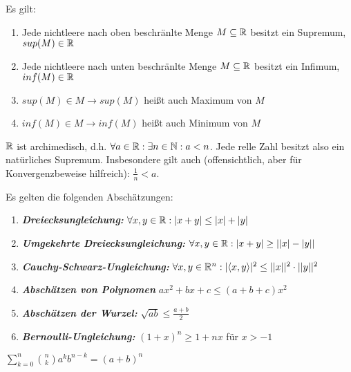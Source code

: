 \begin{satz}[Supremumsaxiom]
	Es gilt:
	\begin{enumerate}[noitemsep]
		\item Jede nichtleere nach oben beschränlte Menge $M \subseteq \mathbb{R}$ besitzt ein Supremum, $sup(M) \in \mathbb{R}$
		\item Jede nichtleere nach unten beschränlte Menge $M \subseteq \mathbb{R}$ besitzt ein Infimum, $inf(M) \in \mathbb{R}$
		\item $sup(M) \in M \rightarrow sup(M)$ heißt auch Maximum von $M$
		\item $inf(M) \in M \rightarrow inf(M)$ heißt auch Minimum von $M$
	\end{enumerate}
\end{satz}

\begin{satz}[Archimedizität]
	$\mathbb{R}$ ist archimedisch, d.h. $\forall a \in \mathbb{R} : \exists n \in \mathbb{N} : a < n $. Jede relle Zahl besitzt also ein natürliches Supremum. Insbesondere gilt auch (offensichtlich, aber für Konvergenzbeweise hilfreich): $\frac{1}{n} < a$.
\end{satz}

\begin{satz}[Abschätzungen]
	Es gelten die folgenden Abschätzungen:
	
	\begin{enumerate}[noitemsep]
		\item \textbf{\emph{Dreiecksungleichung:}} $\forall x,y \in \mathbb{R} : | x + y | \leq |x| + |y|$
		\item \textbf{\emph{Umgekehrte Dreiecksungleichung:}} 	$\forall x,y \in \mathbb{R} : | x + y | \geq ||x| - |y||$
		\item \textbf{\emph{Cauchy-Schwarz-Ungleichung:}} 	$\forall x,y \in \mathbb{R}^n : | \langle x, y \rangle|^2 \leq ||x||^2 \cdot ||y||^2$
		\item \textbf{\emph{Abschätzen von Polynomen}} 	$ax^2 + bx + c \leq (a + b + c)x^2 $
		\item \textbf{\emph{Abschätzen der Wurzel:}} 	$\sqrt{ab} \leq \frac{a + b}{2}$
		\item \textbf{\emph{Bernoulli-Ungleichung:}} 	$(1+x)^n \geq 1 + nx$ für $x > -1$	
	\end{enumerate}
	
\end{satz}

\begin{satz}
	$\sum_{k=0}^{n} \binom{n}{k}a^k b^{n-k} = (a+b)^n$ 
\end{satz}

